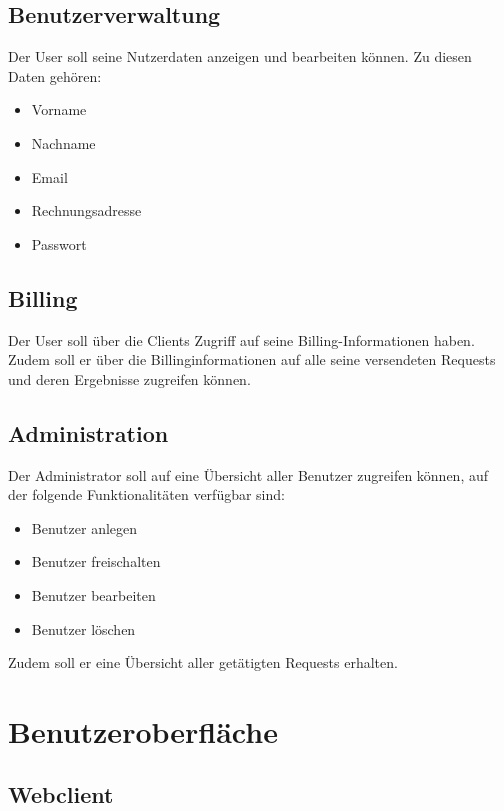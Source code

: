 \documentclass[a4paper,10pt,titlepage]{article}
\begin{document}
\subsection{Benutzerverwaltung}
Der User soll seine Nutzerdaten anzeigen und bearbeiten können. Zu diesen Daten gehören:

\begin{itemize}
	\item Vorname
	\item Nachname
	\item Email
	\item Rechnungsadresse
	\item Passwort
\end{itemize}

\subsection{Billing}
Der User soll über die Clients Zugriff auf seine Billing-Informationen haben.
Zudem soll er über die Billinginformationen auf alle seine versendeten Requests und deren Ergebnisse zugreifen können.

\subsection{Administration}
Der Administrator soll auf eine Übersicht aller Benutzer zugreifen können, auf der folgende Funktionalitäten verfügbar sind:
\begin{itemize}
 \item Benutzer anlegen
 \item Benutzer freischalten
 \item Benutzer bearbeiten
 \item Benutzer löschen
\end{itemize}

Zudem soll er eine Übersicht aller getätigten Requests erhalten.

\clearpage
\section{Benutzeroberfläche}

\subsection{Webclient}
\end{document}
